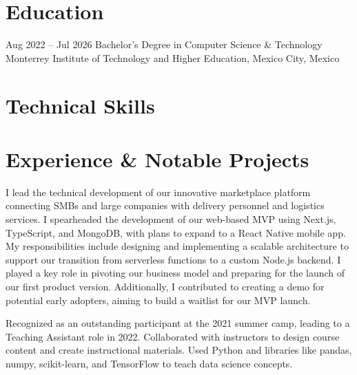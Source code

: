 \documentclass[11pt,a4paper,SF Pro Disp]{moderncv}   %
\begin{document}
\makecvtitle

\section{Education}
\cventry
{Aug 2022 -- Jul 2026}
{Bachelor's Degree in Computer Science \& Technology}
{}
{}
{}
{Monterrey Institute of Technology and Higher Education, Mexico City, Mexico}



\section{Technical Skills}


\section{Experience \& Notable Projects}


{I lead the technical development of our innovative marketplace platform connecting SMBs and large companies with delivery personnel and logistics services. I spearheaded the development of our web-based MVP using Next.js, TypeScript, and MongoDB, with plans to expand to a React Native mobile app. My responsibilities include designing and implementing a scalable architecture to support our transition from serverless functions to a custom Node.js backend. I played a key role in pivoting our business model and preparing for the launch of our first product version. Additionally, I contributed to creating a demo for potential early adopters, aiming to build a waitlist for our MVP launch.}



\vspace{1em}
{Recognized as an outstanding participant at the 2021 summer camp, leading to a Teaching Assistant role in 2022. Collaborated with instructors to design course content and create instructional materials. Used Python and libraries like pandas, numpy, scikit-learn, and TensorFlow to teach data science concepts.}
\end{document}
